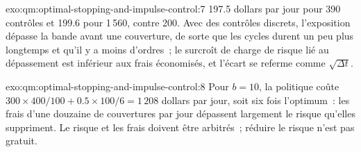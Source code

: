 \begin{solution}{exo:qm:optimal-stopping-and-impulse-control:7}
197.5 dollars par jour pour 390 contrôles et 199.6 pour 1\,560, contre 200. Avec des contrôles discrets, l'exposition dépasse la bande avant une
couverture, de sorte que les cycles durent un peu plus longtemps et qu'il y a moins d'ordres~; le surcroît de charge de risque lié au dépassement est inférieur aux frais économisés, et l'écart se referme
comme $\sqrt{\Delta t}$.
\end{solution}

\begin{solution}{exo:qm:optimal-stopping-and-impulse-control:8}
Pour $b = 10$, la politique coûte $300 \times 400/100 + 0.5 \times 100/6 = 1\,208$ dollars par jour, soit six fois l'optimum~: les frais d'une douzaine
de couvertures par jour dépassent largement le risque qu'elles suppriment. Le risque et les frais doivent être arbitrés~; réduire le risque n'est pas gratuit.
\end{solution}

